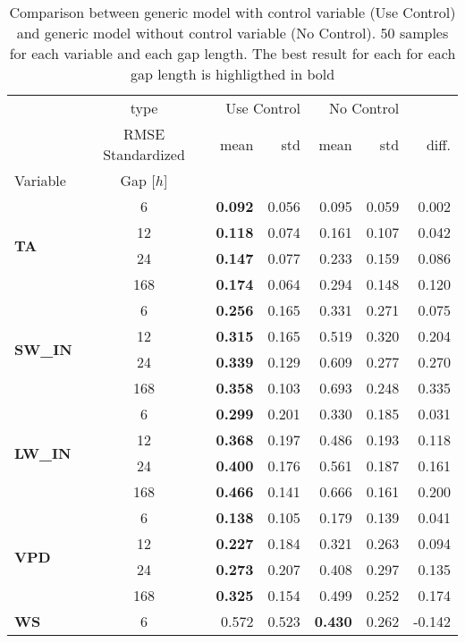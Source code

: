 \begin{table}
\centering
\caption{Comparison between generic model with control variable (Use Control) and generic model without control variable (No Control). 50 samples for each variable and each gap length. The best result for each for each gap length is highligthed in bold}
\label{control}
\begin{tabular}{p{2.1cm}c|rr|rr|r}
\toprule
 & type & \multicolumn{2}{r}{Use Control} & \multicolumn{2}{r}{No Control} &  \\
 & RMSE Standardized & mean & std & mean & std & diff. \\
Variable & Gap [$h$] &  &  &  &  &  \\
\midrule
\multirow[c]{4}{*}{\parbox{2.1cm}{\textbf{TA}}} & 6 & \bfseries 0.092 & 0.056 & 0.095 & 0.059 & 0.002 \\
 & 12 & \bfseries 0.118 & 0.074 & 0.161 & 0.107 & 0.042 \\
 & 24 & \bfseries 0.147 & 0.077 & 0.233 & 0.159 & 0.086 \\
 & 168 & \bfseries 0.174 & 0.064 & 0.294 & 0.148 & 0.120 \\
\cline{1-7}
\multirow[c]{4}{*}{\parbox{2.1cm}{\textbf{SW\_IN}}} & 6 & \bfseries 0.256 & 0.165 & 0.331 & 0.271 & 0.075 \\
 & 12 & \bfseries 0.315 & 0.165 & 0.519 & 0.320 & 0.204 \\
 & 24 & \bfseries 0.339 & 0.129 & 0.609 & 0.277 & 0.270 \\
 & 168 & \bfseries 0.358 & 0.103 & 0.693 & 0.248 & 0.335 \\
\cline{1-7}
\multirow[c]{4}{*}{\parbox{2.1cm}{\textbf{LW\_IN}}} & 6 & \bfseries 0.299 & 0.201 & 0.330 & 0.185 & 0.031 \\
 & 12 & \bfseries 0.368 & 0.197 & 0.486 & 0.193 & 0.118 \\
 & 24 & \bfseries 0.400 & 0.176 & 0.561 & 0.187 & 0.161 \\
 & 168 & \bfseries 0.466 & 0.141 & 0.666 & 0.161 & 0.200 \\
\cline{1-7}
\multirow[c]{4}{*}{\parbox{2.1cm}{\textbf{VPD}}} & 6 & \bfseries 0.138 & 0.105 & 0.179 & 0.139 & 0.041 \\
 & 12 & \bfseries 0.227 & 0.184 & 0.321 & 0.263 & 0.094 \\
 & 24 & \bfseries 0.273 & 0.207 & 0.408 & 0.297 & 0.135 \\
 & 168 & \bfseries 0.325 & 0.154 & 0.499 & 0.252 & 0.174 \\
\cline{1-7}
\multirow[c]{4}{*}{\parbox{2.1cm}{\textbf{WS}}} & 6 & 0.572 & 0.523 & \bfseries 0.430 & 0.262 & -0.142 \\

\end{tabular}
\end{table}
